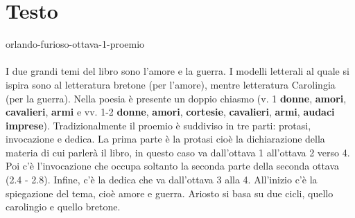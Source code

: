 \documentclass[preview]{standalone}
\begin{document}
\genpage

\section{Testo}


\begin{snippet}{orlando-furioso-ottava-1-proemio}
    \\\\
    I due grandi temi del libro sono l'amore e la guerra.
    I modelli letterali al quale si ispira sono al letteratura bretone (per l'amore),
    mentre letteratura Carolingia (per la guerra).
    Nella poesia è presente un doppio chiasmo (v. 1 \textbf{donne}, \textbf{amori}, \textbf{cavalieri},
    \textbf{armi} e vv. 1-2 \textbf{donne}, \textbf{amori}, \textbf{cortesie}, \textbf{cavalieri}, \textbf{armi}, \textbf{audaci imprese}).
    Tradizionalmente il proemio è suddiviso in tre parti: protasi, invocazione e dedica.
    La prima parte è la protasi cioè la dichiarazione della materia di
    cui parlerà il libro, in questo caso va dall'ottava 1 all'ottava 2 verso 4.
    Poi c'è l'invocazione che occupa soltanto la seconda parte della seconda ottava
    (2.4 - 2.8). Infine, c'è la dedica che va dall'ottava 3 alla 4.
    All'inizio c'è la spiegazione del tema, cioè amore e guerra.
    Ariosto si basa su due cicli, quello carolingio e quello bretone.

\end{snippet}
\end{document}
